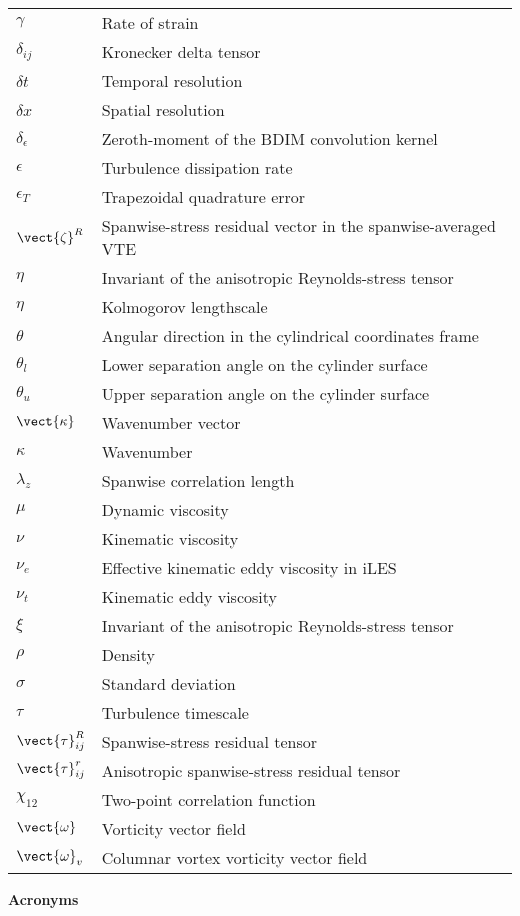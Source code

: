 \begin{longtable}[l]{ll}
$\gamma$ & Rate of strain\tabularnewline
$\delta_{ij}$ & Kronecker delta tensor \tabularnewline
$\delta t$ & Temporal resolution\tabularnewline
$\delta x$ & Spatial resolution\tabularnewline
$\delta_\epsilon$ & Zeroth-moment of the BDIM convolution kernel \tabularnewline
$\epsilon$ & Turbulence dissipation rate \tabularnewline
$\epsilon_T$ & Trapezoidal quadrature error \tabularnewline
$\vect{\zeta}^R$ & Spanwise-stress residual vector in the spanwise-averaged VTE \tabularnewline
$\eta$ & Invariant of the anisotropic Reynolds-stress tensor \tabularnewline
$\eta$ & Kolmogorov lengthscale \tabularnewline
$\theta$ & Angular direction in the cylindrical coordinates frame\tabularnewline
$\theta_l$ & Lower separation angle on the cylinder surface\tabularnewline
$\theta_u$ & Upper separation angle on the cylinder surface\tabularnewline
$\vect{\kappa}$ & Wavenumber vector\tabularnewline
$\kappa$ & Wavenumber\tabularnewline
$\lambda_z$ & Spanwise correlation length \tabularnewline
$\mu$ & Dynamic viscosity\tabularnewline
$\nu$ & Kinematic viscosity\tabularnewline
$\nu_{e}$ & Effective kinematic eddy viscosity in iLES\tabularnewline
$\nu_{t}$ & Kinematic eddy viscosity\tabularnewline
$\xi$ & Invariant of the anisotropic Reynolds-stress tensor \tabularnewline
$\rho$ & Density\tabularnewline
$\sigma$ & Standard deviation\tabularnewline
$\tau$ & Turbulence timescale\tabularnewline
$\vect{\tau}_{ij}^R$ & Spanwise-stress residual tensor\tabularnewline
$\vect{\tau}_{ij}^r$ & Anisotropic spanwise-stress residual tensor\tabularnewline
$\chi_{12}$ & Two-point correlation function\tabularnewline
$\vect{\omega}$ & Vorticity vector field\tabularnewline
$\vect{\omega}_v$ & Columnar vortex vorticity vector field\tabularnewline
\end{longtable}

\textbf{{\large Acronyms}}


